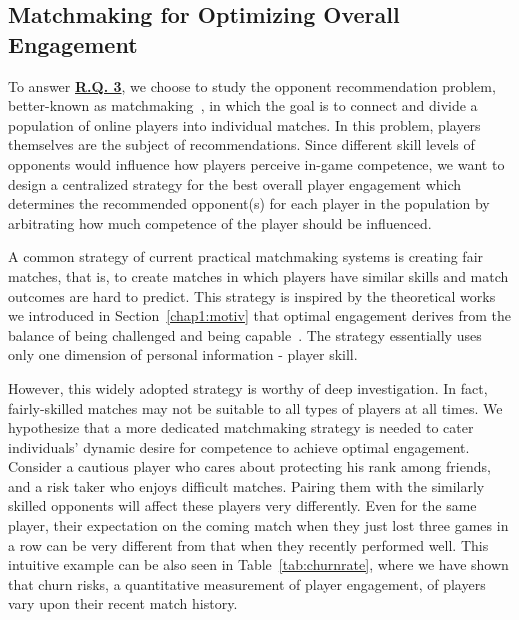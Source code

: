 \subsection{Matchmaking for Optimizing Overall Engagement}\label{sec:thesis_overview:oppo_recom}

To answer \hyperref[rq3]{\textbf{R.Q. 3}}, we choose to study the opponent recommendation problem, better-known as matchmaking~\cite{medler2011using}, in which the goal is to connect and divide a population of online players into individual matches. In this problem, players themselves are the subject of recommendations. Since different skill levels of opponents would influence how players perceive in-game competence, we want to design a centralized strategy for the best overall player engagement which determines the recommended opponent(s) for each player in the population by arbitrating how much competence of the player should be influenced. 

A common strategy of current practical matchmaking systems is creating fair matches, that is, to create matches in which players have similar skills and match outcomes are hard to predict. This strategy is inspired by the theoretical works we introduced in Section~\ref{chap1:motiv} that optimal engagement derives from the balance of being challenged and being capable~\cite{sweetser2005gameflow,flow1990psychology,chen2007flow,graepel2006ranking}. The strategy essentially uses only one dimension of personal information - player skill. 

However, this widely adopted strategy is worthy of deep investigation. In fact, fairly-skilled matches may not be suitable to all types of players at all times. We hypothesize that a more dedicated matchmaking strategy is needed to cater individuals' dynamic desire for competence to achieve optimal engagement. Consider a cautious player who cares about protecting his rank among friends, and a risk taker who enjoys difficult matches. Pairing them with the similarly skilled opponents will affect these players very differently. Even for the same player, their expectation on the coming match when they just lost three games in a row can be very different from that when they recently performed well. This intuitive example can be also seen in Table~\ref{tab:churnrate}, where we have shown that churn risks, a quantitative measurement of player engagement, of players vary upon their recent match history. 


